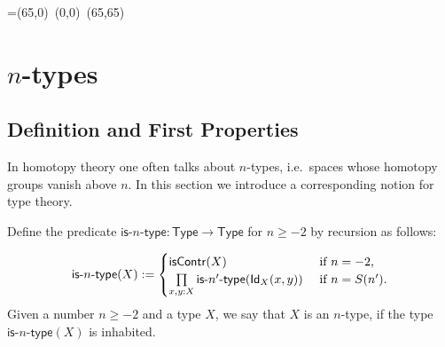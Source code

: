 \newbox\pbbox
\setbox\pbbox=\hbox{\xy \POS(65,0)\ar@{-} (0,0) \ar@{-} (65,65)\endxy}
\def\pb{\save[]+<3.5mm,-3.5mm>*{\copy\pbbox} \restore}


\newcommand{\comp}[2]{\ensuremath{{#2} \circ {#1}}}

%
\newcommand{\contr}{\ensuremath{\mathsf{contr}}}
 \newcommand{\HLevel}{\mathsf{HLevel}}
 \newcommand{\isofhlevel}{\mathsf{isofhlevel}}
 \newcommand{\istype}[1]{\mathsf{is}\mbox{-}{#1}\mbox{-}\mathsf{type}}
 \newcommand{\Type}{\mathsf{Type}}



\chapter{\texorpdfstring{$n$}{n}-types}
\label{cha:hlevels}

\section{Definition and First Properties}

In homotopy theory one often talks about $n$-types, i.e.\ spaces whose homotopy groups vanish above $n$. In this section we introduce a corresponding notion for type theory. 

\begin{defn}\label{def:hlevel}
  Define the predicate $\istype{n} : \Type \to \Type$ for $n \geq -2$ by recursion as follows:

\[ \istype{n}(X) := \begin{cases}
                         \iscontr(X) & \text{ if } n = -2 , \\
                         \prod\limits_{x,y : X}\istype{n'}(\idtype[X]{x}{y}) & \text{ if } n = S(n') .
                        \end{cases}
\]
%
Given a number $n \geq -2$ and a type $X$, we say that $X$ is an $n$-type, if the type $\istype{n}(X)$ is inhabited.
\end{defn}


